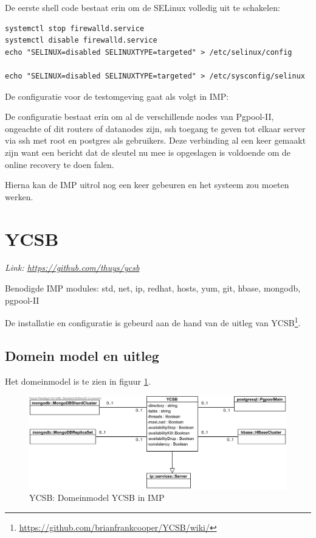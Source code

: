 De eerste shell code bestaat erin om de SELinux volledig uit te schakelen: 
\begin{lstlisting}[frame=single, breaklines=true]
systemctl stop firewalld.service  
systemctl disable firewalld.service  
echo "SELINUX=disabled SELINUXTYPE=targeted" > /etc/selinux/config

echo "SELINUX=disabled SELINUXTYPE=targeted" > /etc/sysconfig/selinux
\end{lstlisting}

De configuratie voor de testomgeving gaat als volgt in IMP: 



De configuratie bestaat erin om al de verschillende nodes van Pgpool-II, ongeachte of dit routers of datanodes zijn, ssh toegang te geven tot elkaar server via ssh met root en postgres als gebruikers. Deze verbinding al een keer gemaakt zijn want een bericht dat de sleutel nu mee is opgeslagen is voldoende om de online recovery te doen falen. 

Hierna kan de IMP uitrol nog een keer gebeuren en het systeem zou moeten werken. 


\section{YCSB}
\textit{Link: \url{https://github.com/thuys/ycsb}}

Benodigde IMP modules: std, net, ip, redhat, hosts, yum, git, hbase, mongodb, pgpool-II 

De installatie en configuratie is gebeurd aan de hand van de uitleg van YCSB\footnote{\url {https://github.com/brianfrankcooper/YCSB/wiki/}}. 

\subsection{Domein model en uitleg}
Het domeinmodel is te zien in figuur \ref{fig:imp-ycsb-domeinmodel}.
\begin{figure}[ht!]
\centering
\includegraphics[width=\linewidth]{img/YCSB-Domeinmodel.png}
\caption{YCSB: Domeinmodel YCSB in IMP}
\label{fig:imp-ycsb-domeinmodel}
\end{figure}

